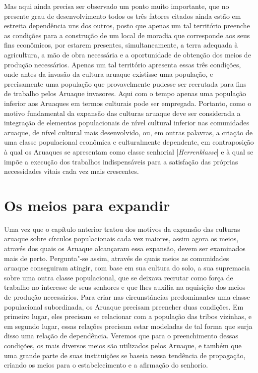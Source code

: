 Mas aqui ainda precisa ser observado um ponto muito importante, que no
presente grau de desenvolvimento todos os três fatores citados ainda
estão em estreita dependência uns dos outros, posto que apenas um tal
território preenche as condições para a construção de um local de
moradia que corresponde aos seus fins econômicos, por estarem presentes,
simultaneamente, a terra adequada à agricultura, a mão de obra
necessária e a oportunidade de obtenção dos meios de produção
necessários. Apenas um tal território apresenta essas três condições,
onde antes da invasão da cultura aruaque existisse uma população, e
precisamente uma população que provavelmente pudesse ser recrutada para
fins de trabalho pelos Aruaque invasores. Aqui com o tempo apenas uma
população inferior aos Aruaques em termos culturais pode ser empregada.
Portanto, como o motivo fundamental da expansão das culturas aruaque
deve ser considerada a integração de elementos populacionais de nível
cultural inferior nas comunidades aruaque, de nível cultural mais
desenvolvido, ou, em outras palavras, a criação de uma classe
populacional econômica e culturalmente dependente, em contraposição à
qual os Aruaques se apresentam como classe senhorial
{[}\textit{Herrenklasse}{]} e à qual se impõe a execução dos trabalhos
indispensáveis para a satisfação das próprias necessidades vitais cada
vez mais crescentes.


\chapter*{Os meios para expandir\smallskip{}}

Uma vez que o capítulo anterior tratou dos motivos da expansão das
culturas aruaque sobre círculos populacionais cada vez maiores, assim
agora os meios, através dos quais os Aruaque alcançaram essa expansão,
devem ser examinados mais de perto. Pergunta"-se assim, através de quais
meios as comunidades aruaque conseguiram atingir, com base em sua
cultura do solo, a sua supremacia sobre uma outra classe populacional,
que se deixava recrutar como força de trabalho no interesse de seus
senhores e que lhes auxilia na aquisição dos meios de produção
necessários. Para criar nas circunstâncias predominantes uma classe
populacional subordinada, os Aruaque precisam preencher duas condições.
Em primeiro lugar, eles precisam se relacionar com a população das
tribos vizinhas, e em segundo lugar, essas relações precisam estar
modeladas de tal forma que surja disso uma relação de dependência.
Veremos que para o preenchimento dessas condições, os mais diversos
meios são utilizados pelos Aruaque, e também que uma grande parte de
suas instituições se baseia nessa tendência de propagação, criando os
meios para o estabelecimento e a afirmação do senhorio.

